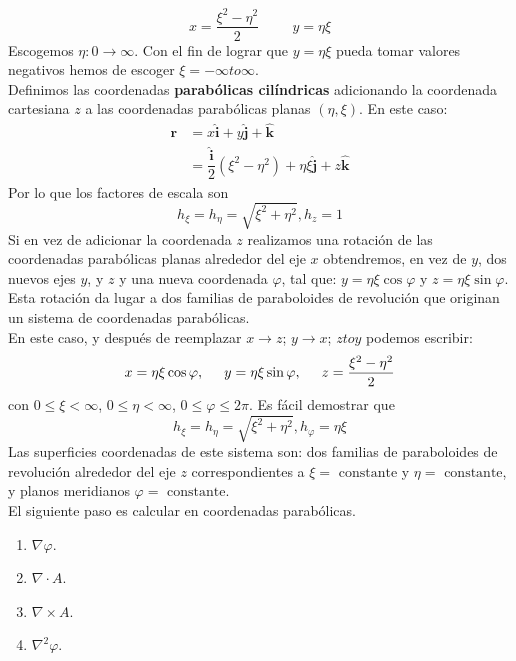 \[ x = \dfrac{\xi^{2} - \eta^{2}}{2} \hspace{1cm} y = \eta \xi \]
Escogemos $\eta:0 \to \infty$. Con el fin de lograr que $y = \eta \xi$ pueda tomar valores negativos hemos de escoger $\xi = -\infty to \infty$.
\\
Definimos las coordenadas \textbf{parabólicas cilíndricas} adicionando la coordenada cartesiana $z$ a las coordenadas parabólicas planas $(\eta, \xi)$. En este caso:
\begin{eqnarray*}
\mathbf{r} &= x \mathbf{\widehat{i}} + y \mathbf{\widehat{j}} + \mathbf{\widehat{k}}  \nonumber \\
&= \dfrac{\mathbf{\widehat{i}}}{2} \left( \xi^{2} - \eta^{2} \right) + \eta \xi \mathbf{\widehat{j}} + z \mathbf{\widehat{k}}
\end{eqnarray*}
Por lo que los factores de escala son
\[ h_{\xi} = h_{\eta} = \sqrt{\xi^{2} + \eta^{2}}, h_{z} = 1  \]
Si en vez de adicionar la coordenada $z$ realizamos una rotación de las coordenadas parabólicas planas alrededor del eje $x$ obtendremos, en vez de $y$, dos nuevos ejes $y$, y $z$ y una nueva coordenada $\varphi$, tal que: $y = \eta \xi \cos \varphi$ y $z= \eta \xi \sin \varphi$.
\\
Esta rotación da lugar a dos familias de paraboloides de revolución que originan un sistema de coordenadas parabólicas.
\\
En este caso, y después de reemplazar $x \to z$; $y \to x$; $z to y$ podemos escribir:
\[ x = \eta \xi \cos \varphi, \hspace{0.5cm} y = \eta \xi \sin \varphi, \hspace{0.5cm} z = \dfrac{\xi^{2} -\eta^{2}}{2} \]
con $0 \leq \xi < \infty$, $0 \leq \eta < \infty$, $0 \leq \varphi \leq 2 \pi$. Es fácil demostrar que
\[ h_{\xi} = h_{\eta} = \sqrt{\xi^{2} + \eta^{2}}, h_{\varphi} = \eta \xi  \]
Las superficies coordenadas de este sistema son: dos familias de paraboloides de revolución alrededor del eje $z$ correspondientes a $\xi = \mbox{ constante}$ y $\eta = \mbox{ constante}$, y planos meridianos $\varphi = \mbox{ constante}$.
\\
El siguiente paso es calcular en coordenadas parabólicas.
\begin{enumerate}
\item $\nabla \varphi$.
\item $\nabla \cdot A$.
\item $\nabla \times A$.
\item $\nabla^{2} \varphi$.
\end{enumerate}

